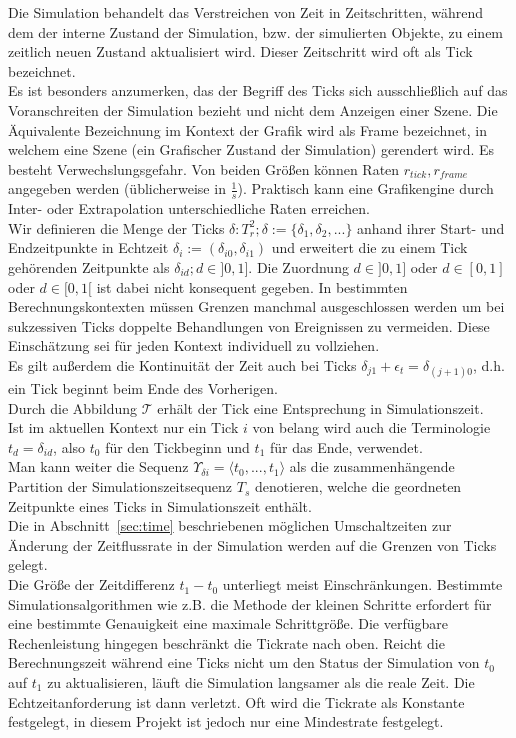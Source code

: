 
Die Simulation behandelt das Verstreichen von Zeit in Zeitschritten, während dem der interne Zustand der Simulation, bzw. der simulierten Objekte, zu einem zeitlich neuen Zustand aktualisiert wird.
Dieser Zeitschritt wird oft als Tick bezeichnet.\\

Es ist besonders anzumerken, das der Begriff des Ticks sich ausschließlich auf das Voranschreiten der Simulation bezieht und nicht dem Anzeigen einer Szene. Die Äquivalente Bezeichnung im Kontext der Grafik wird als Frame bezeichnet, in welchem eine Szene (ein Grafischer Zustand der Simulation) gerendert wird. Es besteht Verwechslungsgefahr. Von beiden Größen können Raten $r_{tick}, r_{frame}$ angegeben werden (üblicherweise in $\frac{1}{s}$). Praktisch kann eine Grafikengine durch Inter- oder Extrapolation unterschiedliche Raten erreichen.\\
Wir definieren die Menge der Ticks $\delta:T_r^2; \delta:=\{\delta_1, \delta_2, ...\}$ anhand ihrer Start- und Endzeitpunkte in Echtzeit $\delta_i := (\delta_{i0}, \delta_{i1})$ und erweitert die zu einem Tick gehörenden Zeitpunkte als $\delta_{id}; d \in ]0,1]$. Die Zuordnung $d \in ]0,1]$ oder  $d \in [0,1]$ oder $d \in [0,1[$ ist dabei nicht konsequent gegeben. In bestimmten Berechnungskontexten müssen Grenzen manchmal ausgeschlossen werden um bei sukzessiven Ticks doppelte Behandlungen von Ereignissen zu vermeiden. Diese Einschätzung sei für jeden Kontext individuell zu vollziehen.\\
Es gilt außerdem die Kontinuität der Zeit auch bei Ticks $\delta_{j1} + \epsilon_t = \delta_{(j+1)0}$, d.h. ein Tick beginnt beim Ende des Vorherigen.\\
Durch die Abbildung $\mathcal{T}$ erhält der Tick eine Entsprechung in Simulationszeit.\\
Ist im aktuellen Kontext nur ein Tick $i$ von belang wird auch die Terminologie $t_d = \delta_{id}$, also $t_0$ für den Tickbeginn und $t_1$ für das Ende, verwendet.\\
Man kann weiter die Sequenz $\Upsilon_{\delta i} = \langle t_0, ...,  t_1\rangle$ als die zusammenhängende Partition der Simulationszeitsequenz $T_s$ denotieren, welche die geordneten Zeitpunkte eines Ticks in Simulationszeit enthält.\\
Die in Abschnitt~\ref{sec:time} beschriebenen möglichen Umschaltzeiten zur Änderung der Zeitflussrate in der Simulation werden auf die Grenzen von Ticks gelegt.\\
Die Größe der Zeitdifferenz $t_1 - t_0$ unterliegt meist Einschränkungen. Bestimmte Simulationsalgorithmen wie z.B. die Methode der kleinen Schritte erfordert für eine bestimmte Genauigkeit eine maximale Schrittgröße. Die verfügbare Rechenleistung hingegen beschränkt die Tickrate nach oben. Reicht die Berechnungszeit während eine Ticks nicht um den Status der Simulation von $t_0$ auf $t_1$ zu aktualisieren, läuft die Simulation langsamer als die reale Zeit. Die Echtzeitanforderung ist dann verletzt. Oft wird die Tickrate als Konstante festgelegt, in diesem Projekt ist jedoch nur eine Mindestrate festgelegt.
